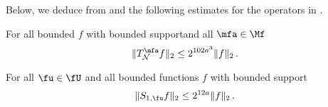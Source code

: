 Below, we deduce  from  and the following estimates for the operators in .

\begin{lemma}
    \label{nontangential-operator-bound}
    \leanok
    For all bounded $f$ with bounded supportand all $\mfa \in \Mf$
    $$
        \|T_{\mathcal{N}}^{\mfa} f\|_2 \le 2^{102a^3} \|f\|_2\,.
    $$
\end{lemma}

\begin{lemma}
    \label{boundary-operator-bound}
    \leanok
    For all $\fu \in \fU$ and all bounded functions $f$ with bounded support
    \begin{equation}
        \label{eq-S-bound}
        \|S_{1,\fu}f\|_2 \le 2^{12a} \|f\|_2\,.
    \end{equation}
\end{lemma}

